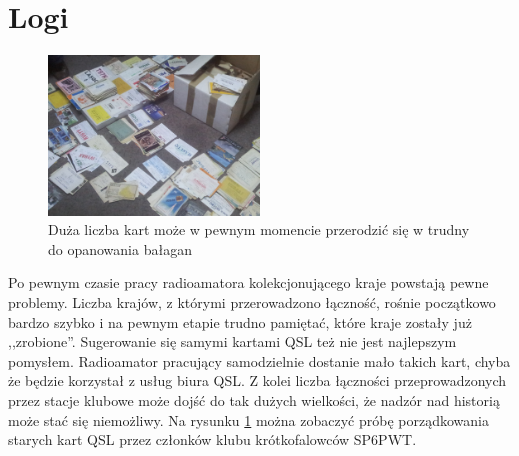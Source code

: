 \documentclass[]{mgr}
\begin{document}
        \section{Logi}
        \begin{figure}
            \vspace{-25pt}
            \begin{center}
                \includegraphics[width=0.5\textwidth]{qsl_mess}
            \end{center}
            \vspace{-20pt}
            \caption{Duża liczba kart może w pewnym momencie przerodzić się w trudny do opanowania bałagan}
            \vspace{-10pt}
            \label{fig:qsl_mess}
        \end{figure}
        Po pewnym czasie pracy radioamatora kolekcjonującego kraje powstają pewne problemy. Liczba krajów, z którymi przerowadzono łączność, rośnie początkowo bardzo szybko i na pewnym etapie trudno pamiętać, które kraje zostały już ,,zrobione''. Sugerowanie się samymi kartami QSL też nie jest najlepszym pomysłem. Radioamator pracujący samodzielnie dostanie mało takich kart, chyba że będzie korzystał z usług biura QSL. Z kolei liczba łączności przeprowadzonych przez stacje klubowe może dojść do tak dużych wielkości, że nadzór nad historią może stać się niemożliwy. Na rysunku \ref{fig:qsl_mess} można zobaczyć próbę porządkowania starych kart QSL przez członków klubu krótkofalowców SP6PWT.
\end{document}
